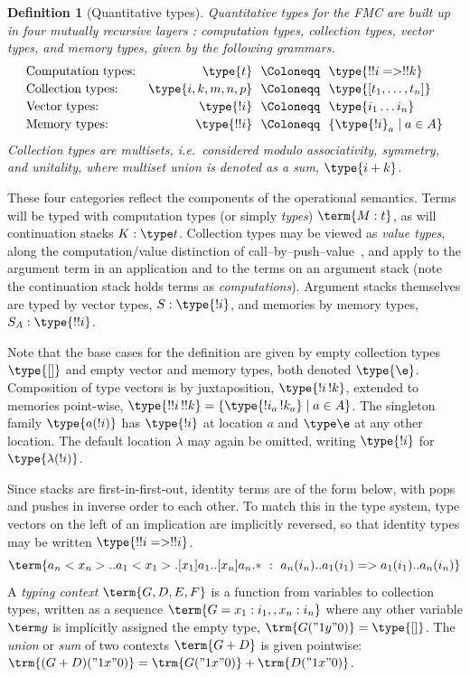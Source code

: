 \documentclass[10pt,a4paper]{amsart}
\newtheorem{definition}[theorem]{Definition}
\newcommand\defn\emph
\begin{document}
\begin{definition}[Quantitative types]
\defn{Quantitative types} for the FMC are built up in four mutually recursive layers : \defn{computation types}, \defn{collection types}, \defn{vector types}, and \emph{memory types}, given by the following grammars.
\[
\begin{array}{lr@{~~}c@{~~}l}
	    \text{Computation types:}	& \type{t}         & \Coloneqq & \type{!!i => !!k}
\\[2pt]	\text{Collection types:}	& \type{i,k,m,n,p} & \Coloneqq & \type{[t_1,\dots,t_n]}
\\[2pt]	\text{Vector types:}		& \type{!i}        & \Coloneqq & \type{i_1\dots i_n}
\\[2pt]	\text{Memory types:}		& \type{!!i}       & \Coloneqq & \{\type{!i}_a\mid a\in A\}	
\end{array}
\]
Collection types are multisets, i.e.\ considered modulo associativity, symmetry, and unitality, where multiset union is denoted as a sum, $\type{i+k}$.
\end{definition}

These four categories reflect the components of the operational semantics. Terms will be typed with computation types (or simply \emph{types}) $\term{M:t}$, as will continuation stacks $K:\type t$. Collection types may be viewed as \emph{value types}, along the computation/value distinction of call--by--push--value~\cite{Levy-2003}, and apply to the argument term in an application and to the terms on an argument stack (note the continuation stack holds terms as \emph{computations}). Argument stacks themselves are typed by vector types, $S:\type{!i}$, and memories by memory types, $S_A:\type{!!i}$.

Note that the base cases for the definition are given by empty collection types $\type{[]}$ and empty vector and memory types, both denoted $\type{\e}$. Composition of type vectors is by juxtaposition, $\type{!i\,!k}$, extended to memories point-wise, $\type{!!i\,!!k}=\{\type{!i_a\,!k_a}\mid a\in A\}$. The singleton family $\type{a(!i)}$ has $\type{!i}$ at location $a$ and $\type\e$ at any other location. The default location $\lambda$ may again be omitted, writing $\type{!i}$ for $\type{\lambda(!i)}$.

Since stacks are first-in-first-out, identity terms are of the form below, with pops and pushes in inverse order to each other. To match this in the type system, type vectors on the left of an implication are implicitly reversed, so that identity types may be written $\type{!!i => !!i}$.
\[
	\term{a_n<x_n>..a_1<x_1>.[x_1]a_1..[x_n]a_n.*~:~a_n(i_n)..a_1(i_1) => a_1(i_1)..a_n(i_n)}
\] 
A \emph{typing context} $\term{G,D,E,F}$ is a function from variables to collection types, written as a sequence $\term{G = x_1:i_1,,x_n:i_n}$ where any other variable $\term y$ is implicitly assigned the empty type, $\trm{G("1y"0)}=\type{[]}$. The \emph{union} or \emph{sum} of two contexts $\term{G+D}$ is given pointwise: $\trm{(G+D)("1x"0)}=\trm{G("1x"0)}+\trm{D("1x"0)}$.
\end{document}
